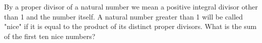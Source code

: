 By a proper divisor of a natural number we mean a positive integral divisor other than 1 and the number itself. A natural number greater than 1 will be called "nice" if it is equal to the product of its distinct proper divisors. What is the sum of the first ten nice numbers?